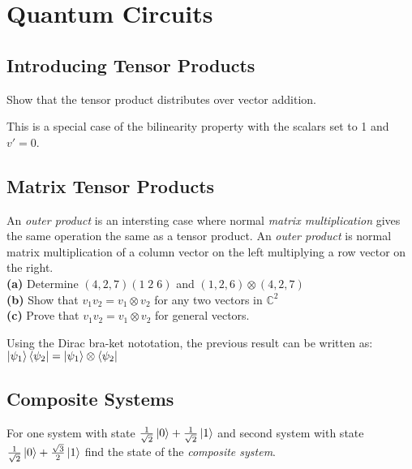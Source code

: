 
\chapter{Quantum Circuits}


\section{Introducing Tensor Products}

\begin{example}
Show that the tensor product distributes over vector addition.
\end{example}

This is a special case of the bilinearity property with 
the scalars set to 1 and $v' = 0$. 


\section{Matrix Tensor Products}

\begin{example}
An \textit{outer product} is an intersting case where normal \textit{matrix multiplication} 
gives the same operation the same as a tensor product. 
An \textit{outer product} is normal matrix multiplication of a column vector on the left multiplying 
a row vector on the right. \\
\textbf{(a)} Determine $(4,2,7)(1\; 2\; 6)$ and $(1,2,6) \otimes (4,2,7)$   \\ 
\textbf{(b)} Show that $v_1 v_2 = v_1 \otimes v_2$ for any two vectors in $\mathbb{C}^2$  \\ 
\textbf{(c)} Prove that $v_1 v_2 = v_1 \otimes v_2$ for general vectors.

\end{example}



\frmrule

Using the Dirac bra-ket nototation, the previous result can 
be written as: $\left|\psi_1\right\rangle\left\langle\psi_2\right| = \left|\psi_1\right\rangle \otimes \left\langle\psi_2\right|$

\section{Composite Systems}

\begin{example}
For one system with state $\frac{1}{\sqrt{2}} \left|0\right\rangle + \frac{1}{\sqrt{2}} \left|1\right\rangle$
and second system with state $\frac{1}{\sqrt{2}} \left|0\right\rangle + \frac{\sqrt{3}}{2} \left|1\right\rangle$ 
find the state of the \textit{composite system}.
\end{example}

